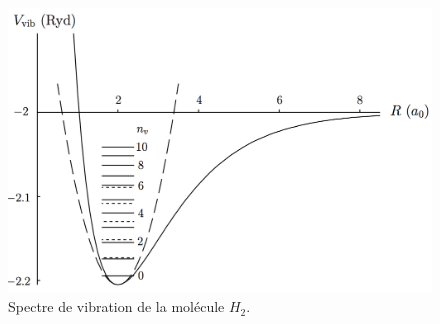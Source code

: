 \begin{figure}[h]
	\begin{center}
		\includegraphics[scale=0.5]{img/1}
		\caption{Spectre de vibration de la molécule $H_2$.}
	\end{center}
\end{figure}